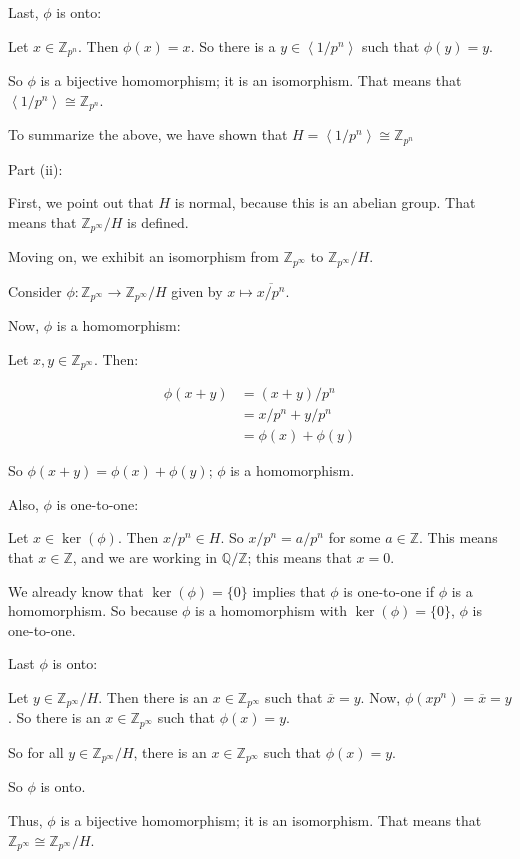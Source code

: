 \documentclass[a4paper,12pt]{article}
\newcommand{\tab}{\hspace{4mm}} %
\newcommand{\shunt}{\vspace{20mm}}
\newcommand{\anbrack}[1]{\left\langle #1 \right\rangle}
\newcommand{\Q}{\mathbb{Q}}
\newcommand{\Z}{\mathbb{Z}}
\begin{document}
Last, $\phi$ is onto:

\tab Let $x \in \Z_{p^n}$. Then $\phi(x) = x$. So there is a $y \in \anbrack{1/p^n}$ such that $\phi(y) = y$.

So $\phi$ is a bijective homomorphism; it is an isomorphism. That means that $\anbrack{1/p^n} \cong \Z_{p^n}$.

To summarize the above, we have shown that $H = \anbrack{1/p^n} \cong \Z_{p^n}$

\shunt

Part (ii):

First, we point out that $H$ is normal, because this is an abelian group. That means that $\Z_{p^\infty}/H$ is defined.

Moving on, we exhibit an isomorphism from $\Z_{p^\infty}$ to $\Z_{p^\infty}/H$.

Consider $\phi: \Z_{p^\infty} \to \Z_{p^\infty}/H $ given by $x \mapsto \overline{x/p^n}$.

Now, $\phi$ is a homomorphism:

\tab Let $x,y \in \Z_{p^\infty}$. Then:

\begin{align*}
\phi(x+y) &= (x+y)/p^n\\
&= x/p^n + y/p^n\\
&= \phi(x)+\phi(y)
\end{align*}

\tab So $\phi(x+y) = \phi(x) + \phi(y)$; $\phi$ is a homomorphism.

Also, $\phi$ is one-to-one:

\tab Let $x \in \ker(\phi)$. Then $x/p^n \in H$. So $x/p^n = a/p^n$ for some $a \in \Z$. This means that $x \in \Z$, and we are working in $\Q/\Z$; this means that $x = 0$.

\tab We already know that $\ker(\phi)=\{0\}$ implies that $\phi$ is one-to-one if $\phi$ is a homomorphism. So because $\phi$ is a homomorphism with $\ker (\phi)=\{0\}$, $\phi$ is one-to-one.

Last $\phi$ is onto:

\tab Let $y \in \Z_{p^\infty}/H$. Then there is an $x \in \Z_{p^\infty}$ such that $\overline{x} = y$. Now, $\phi(xp^n) = \overline{x} = y$. So there is an $x \in \Z_{p^\infty}$ such that $\phi(x)=y$.

\tab So for all $y \in \Z_{p^\infty}/H$, there is an $x \in \Z_{p^\infty}$ such that $\phi(x)=y$.

\tab So $\phi$ is onto.

Thus, $\phi$ is a bijective homomorphism; it is an isomorphism. That means that $\Z_{p^\infty} \cong \Z_{p^\infty}/H$.
\end{document}
